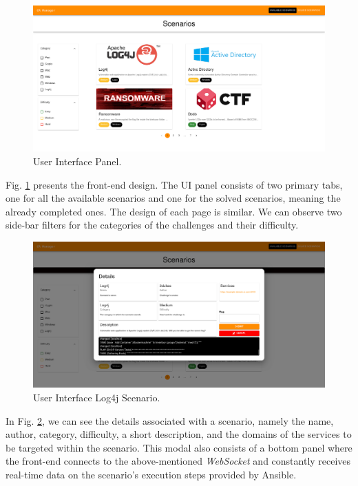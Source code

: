 \begin{figure}[H]
    \includegraphics[width=13cm]{figures/ui_dashboard.png}
    \caption{User Interface Panel.}
    \label{fig:ui_panel}
\end{figure}

Fig. \ref{fig:ui_panel} presents the front-end design. The UI panel consists of two primary tabs, one for all the available scenarios and one for the solved scenarios, meaning the already completed ones. The design of each page is similar. We can observe two side-bar filters for the categories of the challenges and their difficulty. 

\begin{figure}[H]
    \includegraphics[width=13cm]{figures/ui_example_scenario.png}
    \caption{User Interface Log4j Scenario.}
    \label{fig:ui_log4j_scenario}
\end{figure}

In Fig. \ref{fig:ui_log4j_scenario}, we can see the details associated with a scenario, namely the name, author, category, difficulty, a short description, and the domains of the services to be targeted within the scenario. This modal also consists of a bottom panel where the front-end connects to the above-mentioned \textit{WebSocket} and constantly receives real-time data on the scenario's execution steps provided by Ansible. 

